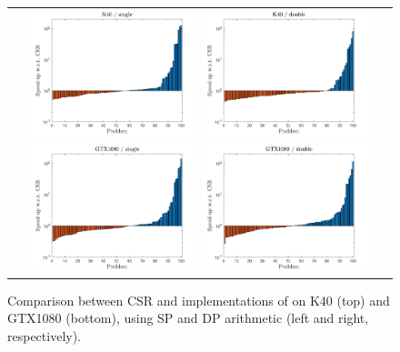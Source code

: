 \begin{figure}[t]
\begin{tabular}{c}
\includegraphics[width=0.45\textwidth]{plots/speedup_K40_single.pdf}
\includegraphics[width=0.45\textwidth]{plots/speedup_K40_double.pdf}\\
\includegraphics[width=0.45\textwidth]{plots/speedup_GTX1080_single.pdf}
\includegraphics[width=0.45\textwidth]{plots/speedup_GTX1080_double.pdf}
\end{tabular}
\caption[Comparison between CSR and \bcsr implementations]
    {Comparison between CSR and \bcsr implementations of \spmv on K40 (top) and
    GTX1080 (bottom), using SP and DP arithmetic (left and right,
    respectively).}
\label{2017-csr-spmv:fig:bcsr}
\end{figure}

